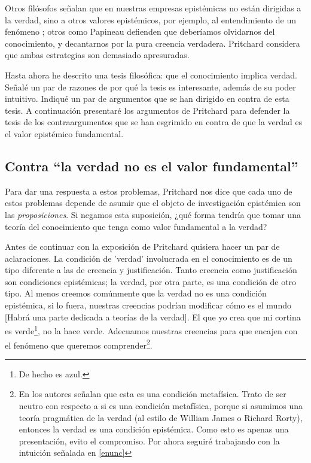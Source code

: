 \documentclass[12pt]{article}
\begin{document}
Otros filósofos señalan que en nuestras empresas epistémicas no están dirigidas a la verdad, sino a otros valores epistémicos, por ejemplo, al entendimiento de un fenómeno \cite{Elgin2004}; otros como Papineau \cite{Papineau2021} defienden que deberíamos olvidarnos del conocimiento, y decantarnos por la pura creencia verdadera. Pritchard considera que ambas estrategias son demasiado apresuradas.

Hasta ahora he descrito una tesis filosófica: que el conocimiento implica verdad. Señalé un par de razones de por qué la tesis es interesante, además de su poder intuitivo. Indiqué un par de argumentos que se han dirigido en contra de esta tesis. A continuación presentaré los argumentos de Pritchard para defender la tesis de los contraargumentos que se han esgrimido en contra de que la verdad es el valor epistémico fundamental.

\subsection{Contra ``la verdad no es el valor fundamental''}

Para dar una respuesta a estos problemas, Pritchard nos dice que cada uno de estos problemas depende de asumir que el objeto de investigación epistémica son las \textit{proposiciones}. Si negamos esta suposición, ¿qué forma tendría que tomar una teoría del conocimiento que tenga como valor fundamental a la verdad?

Antes de continuar con la exposición de Pritchard quisiera hacer un par de aclaraciones. La condición de 'verdad' involucrada en el conocimiento es de un tipo diferente a las de creencia y justificación. Tanto creencia como justificación son condiciones epistémicas; la verdad, por otra parte, es una condición de otro tipo. Al menos creemos comúnmente que la verdad no es una condición epistémica, si lo fuera, nuestras creencias podrían modificar cómo es el mundo [Habrá una parte dedicada a teorías de la verdad]. El que yo crea que mi cortina es verde\footnote{De hecho es azul.}, no la hace verde. Adecuamos nuestras creencias para que encajen con el fenómeno que queremos comprender\footnote{En \cite{sep-knowledge-analysis} los autores señalan que esta es una condición metafísica. Trato de ser neutro con respecto a si es una condición metafísica, porque si asumimos una teoría pragmática de la verdad (al estilo de William James o Richard Rorty), entonces la verdad es una condición epistémica. Como esto es apenas una presentación, evito el compromiso. Por ahora seguiré trabajando con la intuición señalada en \ref{enunc}}.  
\end{document}
